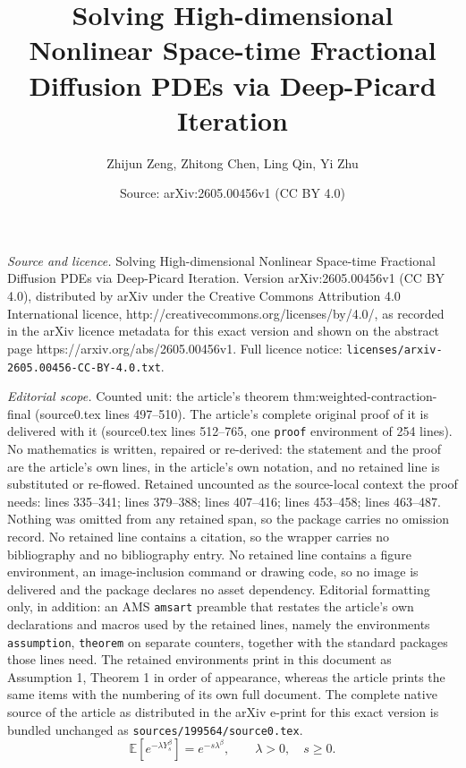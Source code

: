\documentclass[10pt,a4paper]{amsart}
\title{Solving High-dimensional Nonlinear Space-time Fractional Diffusion PDEs via Deep-Picard Iteration}
\author{Zhijun Zeng, Zhitong Chen, Ling Qin, Yi Zhu}
\date{Source: arXiv:2605.00456v1 (CC BY 4.0)}
\begin{document}
\maketitle

\noindent\emph{Source and licence.} Solving High-dimensional Nonlinear Space-time Fractional Diffusion PDEs via Deep-Picard Iteration. Version arXiv:2605.00456v1 (CC BY 4.0), distributed by arXiv under the Creative Commons Attribution 4.0 International licence, http://creativecommons.org/licenses/by/4.0/, as recorded in the arXiv licence metadata for this exact version and shown on the abstract page https://arxiv.org/abs/2605.00456v1. Full licence notice: \texttt{licenses/arxiv-2605.00456-CC-BY-4.0.txt}.\par\smallskip

\noindent\textit{Editorial scope.} Counted unit: the article's theorem thm:weighted-contraction-final (source0.tex lines 497--510). The article's complete original proof of it is delivered with it (source0.tex lines 512--765, one \texttt{proof} environment of 254 lines). No mathematics is written, repaired or re-derived: the statement and the proof are the article's own lines, in the article's own notation, and no retained line is substituted or re-flowed.  Retained uncounted as the source-local context the proof needs: lines 335--341; lines 379--388; lines 407--416; lines 453--458; lines 463--487.  Nothing was omitted from any retained span, so the package carries no omission record.  No retained line contains a citation, so the wrapper carries no bibliography and no bibliography entry.  No retained line contains a figure environment, an image-inclusion command or drawing code, so no image is delivered and the package declares no asset dependency.  Editorial formatting only, in addition: an AMS \texttt{amsart} preamble that restates the article's own declarations and macros used by the retained lines, namely the environments \texttt{assumption}, \texttt{theorem} on separate counters, together with the standard packages those lines need.  The retained environments print in this document as Assumption 1, Theorem 1 in order of appearance, whereas the article prints the same items with the numbering of its own full document.  The complete native source of the article as distributed in the arXiv e-print for this exact version is bundled unchanged as \texttt{sources/199564/source0.tex}.
\begin{equation}\label{eq:stable-laplace}
\mathbb{E}\!\left[e^{-\lambda Y_s^\beta}\right]
=
e^{-s\lambda^\beta},
\qquad
\lambda>0,\quad s\ge0 .
\end{equation}
\end{document}
